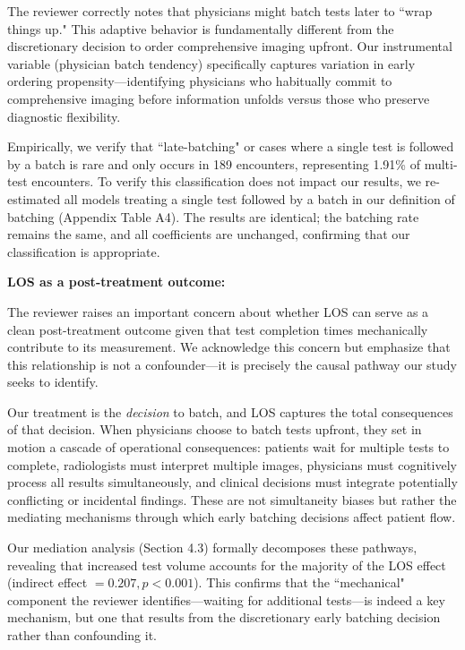 \documentclass[11pt]{article}
\newcommand{\1}{\hbox{\rm 1\kern-.35em 1}}
\begin{document}
{{The reviewer correctly notes that physicians might batch tests later to ``wrap things up." This adaptive behavior is fundamentally different from the discretionary decision to order comprehensive imaging upfront. Our instrumental variable (physician batch tendency) specifically captures variation in early ordering propensity---identifying physicians who habitually commit to comprehensive imaging before information unfolds versus those who preserve diagnostic flexibility.

Empirically, we verify that ``late-batching" or cases where a single test is followed by a batch is rare and only occurs in 189 encounters, representing 1.91\% of multi-test encounters. To verify this classification does not impact our results, we re-estimated all models treating a single test followed by a batch in our definition of batching (Appendix Table A4). The results are identical; the batching rate remains the same, and all coefficients are unchanged, confirming that our
classification is appropriate.

\textbf{LOS as a post-treatment outcome:}

The reviewer raises an important concern about whether LOS can serve as a clean post-treatment outcome given that test completion times mechanically contribute to its measurement. We acknowledge this concern but emphasize that this relationship is not a confounder—it is precisely the causal pathway our study seeks to identify.

Our treatment is the \textit{decision} to batch, and LOS captures the total consequences of that decision. When physicians choose to batch tests upfront, they set in motion a cascade of operational consequences: patients wait for multiple tests to complete, radiologists must interpret multiple images, physicians must cognitively process all results simultaneously, and clinical decisions must integrate potentially conflicting or incidental findings. These are not simultaneity biases but rather the mediating mechanisms through which early batching decisions affect patient flow.

Our mediation analysis (Section 4.3) formally decomposes these pathways, revealing that increased test volume accounts for the majority of the LOS effect (indirect effect $= 0.207, p < 0.001$). This confirms that the ``mechanical" component the reviewer identifies—waiting for additional tests—is indeed a key mechanism, but one that results from the discretionary early batching decision rather than confounding it.

}}
\end{document}
